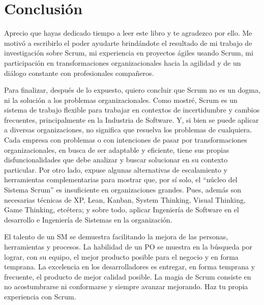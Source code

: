 \chapter{Conclusión}

Aprecio que hayas dedicado tiempo a leer este libro y te agradezco por ello. Me motivó a escribirlo el poder ayudarte brindándote el resultado de mi trabajo de investigación sobre Scrum, mi experiencia en proyectos ágiles usando Scrum, mi participación en transformaciones organizacionales hacia la agilidad y de un diálogo constante con profesionales compañeros. 

Para finalizar, después de lo expuesto, quiero concluir que Scrum no es un dogma, ni la solución a los problemas organizacionales. Como mostré, Scrum es un sistema de trabajo flexible para trabajar en contextos de incertidumbre y cambios frecuentes, principalmente en la Industria de Software. Y, si bien se puede aplicar a diversas organizaciones, no significa que resuelva los problemas de cualquiera. Cada empresa con problemas o con intenciones de pasar por transformaciones organizacionales, en busca de ser adaptable y eficiente, tiene sus propias disfuncionalidades que debe analizar y buscar solucionar en su contexto particular. Por otro lado, expuse algunas alternativas de escalamiento y herramientas complementarias para mostrar que, por sí solo, el “núcleo del Sistema Scrum” es insuficiente en organizaciones grandes. Pues, además son necesarias técnicas de XP, Lean, Kanban, System Thinking, Visual Thinking, Game Thinking, etcétera; y sobre todo, aplicar Ingeniería de Software en el desarrollo e Ingeniería de Sistemas en la organización.

El talento de un SM se demuestra facilitando la mejora de las personas, herramientas y procesos. La habilidad de un PO se muestra en la búsqueda por lograr, con su equipo, el mejor producto posible para el negocio y en forma temprana. La excelencia en los desarrolladores es entregar, en forma temprana y frecuente, el producto de mejor calidad posible. La magia de Scrum consiste en no acostumbrarse ni conformarse y siempre avanzar mejorando. Haz tu propia experiencia con Scrum.
